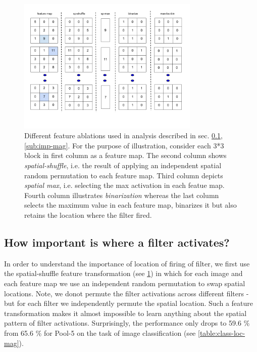 \documentclass[runningheads]{llncs}
\begin{document}
\begin{figure}[H]
\centering
\includegraphics[height=6.5cm]{images/features.png}
\caption{Different feature ablations used in analysis described in sec. \ref{sub:imp-loc}, \ref{sub:imp-mag}. For the purpose of illustration, consider each 3*3 block in first column as a feature map. The second column shows \textit{spatial-shuffle}, i.e. the  result of applying an independent spatial random permutation to each feature map. Third column depicts \textit{spatial max}, i.e. selecting the max activation in each featue map. Fourth column illustrates \textit{binarization} whereas the last column selects the maximum value in each feature map, binarizes it but also retains the location where the filter fired.}
\label{fig:features}
\end{figure}

\subsection{How important is where a filter activates?}
\label{sub:imp-loc}
In order to understand the importance of location of firing of filter, we first use the spatial-shuffle feature transformation (see \ref{fig:features}) in which for each image and each feature map we use an independent random permutation to swap spatial locations. Note, we donot permute the filter activations across different filters - but for each filter we independently permute the spatial location. Such a feature transformation makes it almost impossible to learn anything about the spatial pattern of filter activations. Surprisingly, the performance only drops to 59.6 \% from 65.6 \% for Pool-5 on the task of image classification (see \ref{table:class-loc-mag}). 
\end{document}
